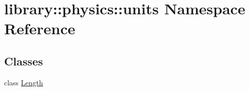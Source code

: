 \hypertarget{namespacelibrary_1_1physics_1_1units}{}\section{library\+:\+:physics\+:\+:units Namespace Reference}
\label{namespacelibrary_1_1physics_1_1units}
\subsection*{Classes}
\begin{DoxyCompactItemize}
\item 
class \hyperlink{classlibrary_1_1physics_1_1units_1_1_length}{Length}
\end{DoxyCompactItemize}
